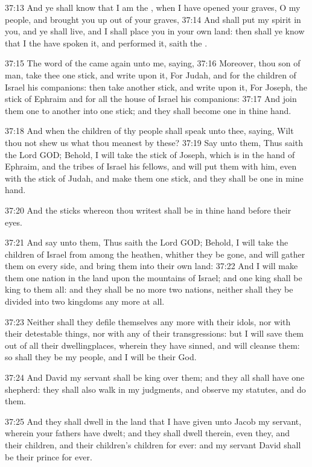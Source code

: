 37:13 And ye shall know that I am the \LORD, when I have opened your graves, O my people, and brought you up out of your graves, 37:14 And shall put my spirit in you, and ye shall live, and I shall place you in your own land: then shall ye know that I the \LORD have spoken it, and performed it, saith the \LORD.

37:15 The word of the \LORD came again unto me, saying, 37:16 Moreover, thou son of man, take thee one stick, and write upon it, For Judah, and for the children of Israel his companions: then take another stick, and write upon it, For Joseph, the stick of Ephraim and for all the house of Israel his companions: 37:17 And join them one to another into one stick; and they shall become one in thine hand.

37:18 And when the children of thy people shall speak unto thee, saying, Wilt thou not shew us what thou meanest by these?  37:19 Say unto them, Thus saith the Lord GOD; Behold, I will take the stick of Joseph, which is in the hand of Ephraim, and the tribes of Israel his fellows, and will put them with him, even with the stick of Judah, and make them one stick, and they shall be one in mine hand.

37:20 And the sticks whereon thou writest shall be in thine hand before their eyes.

37:21 And say unto them, Thus saith the Lord GOD; Behold, I will take the children of Israel from among the heathen, whither they be gone, and will gather them on every side, and bring them into their own land: 37:22 And I will make them one nation in the land upon the mountains of Israel; and one king shall be king to them all: and they shall be no more two nations, neither shall they be divided into two kingdoms any more at all.

37:23 Neither shall they defile themselves any more with their idols, nor with their detestable things, nor with any of their transgressions: but I will save them out of all their dwellingplaces, wherein they have sinned, and will cleanse them: so shall they be my people, and I will be their God.

37:24 And David my servant shall be king over them; and they all shall have one shepherd: they shall also walk in my judgments, and observe my statutes, and do them.

37:25 And they shall dwell in the land that I have given unto Jacob my servant, wherein your fathers have dwelt; and they shall dwell therein, even they, and their children, and their children's children for ever: and my servant David shall be their prince for ever.

